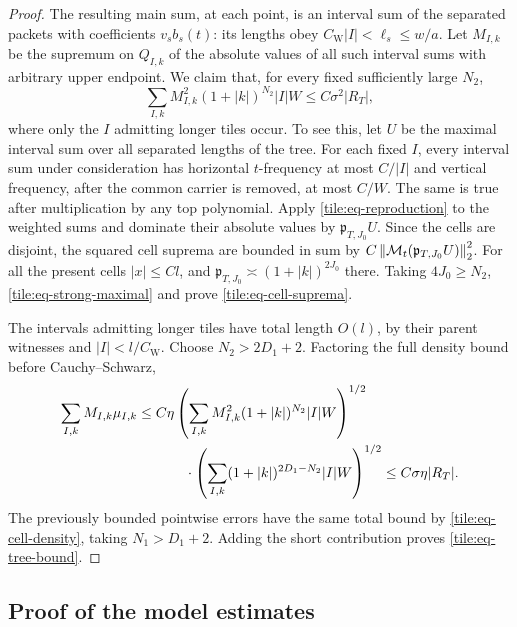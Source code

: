 \begin{proof}
The resulting main sum, at each point,
is an interval sum of the separated
packets with coefficients \(v_sb_s(t)\):
its lengths obey
\(C_{\mathrm W}|I|<\ell_s\leq w/a\).
Let \(M_{I,k}\) be the supremum on
\(Q_{I,k}\) of the absolute values of
all such interval sums with arbitrary
upper endpoint.  We claim that, for
every fixed sufficiently large \(N_2\),
\begin{equation}\label{tile:eq-cell-suprema}
 \sum_{I,k} M_{I,k}^2(1+|k|)^{N_2}|I|W
                    \leq C\sigma^2|R_T|,
\end{equation}
where only the \(I\) admitting longer
tiles occur.  To see this, let \(U\)
be the maximal interval sum over all
separated lengths of the tree.  For
each fixed \(I\), every interval sum
under consideration has horizontal
\(t\)-frequency at most \(C/|I|\)
and vertical frequency, after the
common carrier is removed, at most
\(C/W\).  The same is true after
multiplication by any top polynomial.
Apply \eqref{tile:eq-reproduction}
to the weighted sums and dominate
their absolute values by
\(\mathfrak p_{T,J_0}U\).  Since the
cells are disjoint, the squared cell
suprema are bounded in sum by
\(C\left\|\mathcal M_t
        (\mathfrak p_{T,J_0}U)\right\|_2^2\).
For all the present cells
\(|x|\leq Cl\), and
\(\mathfrak p_{T,J_0}\asymp
 (1+|k|)^{2J_0}\) there.  Taking
\(4J_0\geq N_2\),
\eqref{tile:eq-strong-maximal} and
 prove
\eqref{tile:eq-cell-suprema}.

The intervals admitting longer tiles
have total length \(O(l)\), by their
parent witnesses and
\(|I|<l/C_{\mathrm W}\).  Choose
\(N_2>2D_1+2\).  Factoring the full
density bound before Cauchy--Schwarz,
\begin{align*}
 \sum_{I,k}M_{I,k}\mu_{I,k}
 &\leq C\eta
   \left(\sum_{I,k}M_{I,k}^2
          (1+|k|)^{N_2}|I|W\right)^{1/2}\\
 &\hspace{1.2cm}\cdot
   \left(\sum_{I,k}(1+|k|)^{2D_1-N_2}|I|W\right)^{1/2}
 \leq C\sigma\eta|R_T|.
\end{align*}
The previously bounded pointwise
errors have the same total bound
by \eqref{tile:eq-cell-density},
taking \(N_1>D_1+2\).  Adding the
short contribution proves
\eqref{tile:eq-tree-bound}.
\end{proof}

\subsection{Proof of the model estimates}

